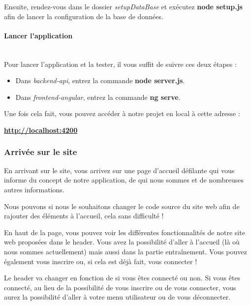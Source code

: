 \documentclass[12pt,french]{article}
\begin{document}
\bigskip

Ensuite, rendez-vous dans le dossier \textit{setupDataBase} et exécutez \textbf{node setup.js} afin de lancer la configuration de la base de données.

\paragraph{Lancer l'application \\\\}

Pour lancer l'application et la tester, il vous suffit de suivre ces deux étapes :

\begin{itemize}
	\item Dans \textit{backend-api}, entrez la commande \textbf{node server.js}.
	\item Dans \textit{frontend-angular}, entrez la commande \textbf{ng serve}.
\end{itemize}

Une fois cela fait, vous pouvez accéder à notre projet en local à cette adresse :

\textbf{\href{http://localhost:4200}{http://localhost:4200}}

\subsubsection{Arrivée sur le site}

En arrivant sur le site, vous arrivez sur une page d'accueil défilante qui vous informe du concept de notre application, de qui nous sommes et de nombreuses autres informations.

Nous pouvons si nous le souhaitons changer le code source du site web afin de rajouter des éléments à l'accueil, cela sans difficulté !

\bigskip

En haut de la page, vous pouvez voir les différentes fonctionnalités de notre site web proposées dans le \gls{header}. Vous avez la possibilité d'aller à l'accueil (là où nous sommes actuellement) mais aussi dans la partie entraînement. Vous pouvez également vous inscrire ou, si cela est déjà fait, vous connecter !

Le \gls{header} va changer en fonction de si vous êtes connecté ou non. Si vous êtes connecté, au lieu de la possibilité de vous inscrire ou de vous connecter, vous aurez la possibilité d'aller à votre menu utilisateur ou de vous déconnecter.
\end{document}
